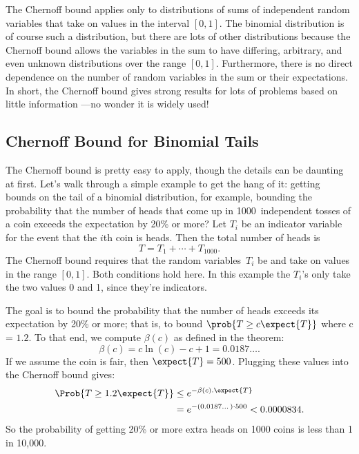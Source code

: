 The Chernoff bound applies only to distributions of sums of
independent random variables that take on values in the interval $[0,
  1]$.  The binomial distribution is of course such a distribution,
but there are lots of other distributions because the Chernoff bound
allows the variables in the sum to have differing, arbitrary, and even
unknown distributions over the range $[0, 1]$.  Furthermore, there is
no direct dependence on the number of random variables in the sum or
their expectations.  In short, the Chernoff bound gives strong results
for lots of problems based on little information ---no wonder it is
widely used!

\subsection{Chernoff Bound for Binomial Tails}

The Chernoff bound is pretty easy to apply, though the details can be
daunting at first.  Let's walk through a simple example to get the
hang of it: getting bounds on the tail of a binomial distribution, for
example, bounding the probability that the number of heads that come up in
1000~independent tosses of a coin exceeds the expectation by 20\%
or more?  Let $T_i$ be an indicator variable for the event that the
$i$th coin is heads.  Then the total number of heads is
\begin{equation*}
    T = T_1 + \cdots + T_{1000}.
\end{equation*}
The Chernoff bound requires that the random variables~$T_i$ be
 and take on values in the range $[0, 1]$.
Both conditions hold here.  In this example the $T_i$'s only take the two
values 0 and 1, since they're indicators.

The goal is to bound the probability that the number of heads exceeds
its expectation by 20\% or more; that is, to bound $\prob{T \geq c
  \expect{T}}$ where c = $1.2$.  To that end, we compute $\beta(c)$ as
defined in the theorem:
\[
\beta(c) = c \ln(c) - c + 1 = 0.0187\dots.
\]
If we assume the coin is fair, then $\expect{T} = 500$.
Plugging these values into the Chernoff bound gives:
\begin{align*}
\Prob{T \geq 1.2 \expect{T}} & \leq  e^{- \beta(c). \expect{T}} \\
  & = e^{- (0.0187\dots) \cdot 500} <  0.0000834.
\end{align*}
So the probability of getting 20\% or more extra heads on 1000 coins
is less than 1 in 10,000.

